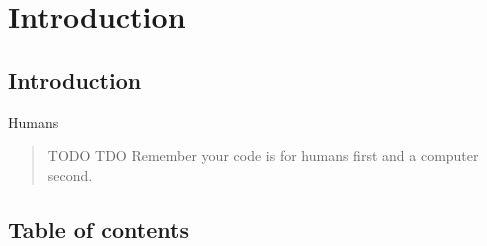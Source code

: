 %
%

\section{Introduction}

\subsection{Introduction}
\begin{FrameWithSubSection}
    \begin{block}{Humans}
        \begin{quote}
            TODO TDO
            Remember your code is for humans first and a computer second.
        \end{quote}
    \end{block}
\end{FrameWithSubSection}

\subsection{Table of contents}
